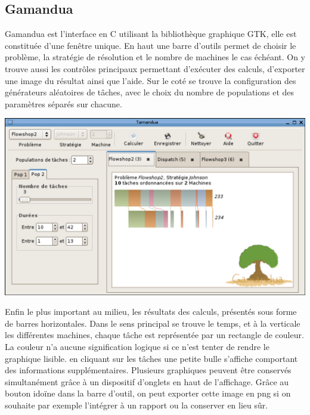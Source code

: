 \subsection{Gamandua}
Gamandua est l'interface en C utilisant la bibliothèque graphique GTK, elle est
constituée d'une fenêtre unique. En haut une barre d'outils permet de choisir 
le problème, la stratégie de résolution et le nombre de machines le cas échéant.
On y trouve aussi les contrôles principaux permettant d'exécuter des calculs,
d'exporter une image du résultat ainsi que l'aide. Sur le coté se trouve la
configuration des générateurs aléatoires de tâches, avec le choix du nombre
de populations et des paramètres séparés sur chacune.
\begin{center}
\includegraphics{gamandua.png}
\end{center}
Enfin le plus important au
milieu, les résultats des calculs, présentés sous forme de barres horizontales.
Dans le sens principal se trouve le temps, et à la verticale les différentes
machines, chaque tâche est représentée par un rectangle de couleur. La couleur
n'a aucune signification logique si ce n'est tenter de rendre le graphique
lisible. en cliquant sur les tâches une petite bulle s'affiche comportant des
informations supplémentaires. Plusieurs graphiques peuvent être conservés
simultanément grâce à un dispositif d'onglets en haut de l'affichage. Grâce au
bouton idoïne dans la barre d'outil, on peut exporter cette image en png si
on souhaite par exemple l'intégrer à un rapport ou la conserver en lieu sûr.
